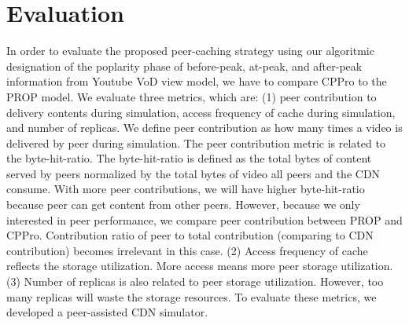 


\section{Evaluation}\label{evaluation}
In order to evaluate the proposed peer-caching strategy using our algoritmic designation of the poplarity phase of before-peak, at-peak, and after-peak information from Youtube VoD view model, we have to compare CPPro to the PROP model.
We evaluate three metrics, which are: (1) peer contribution to delivery contents during simulation,  access frequency of cache during simulation, and number of replicas. 
We define peer contribution as how many times a video is delivered by peer during simulation.
The peer contribution metric is related to the byte-hit-ratio. 
The byte-hit-ratio is defined as the total bytes of content served by peers normalized by the total bytes of video all peers and the CDN consume.
With more peer contributions, we will have higher byte-hit-ratio because peer can get content from other peers. 
However, because we only interested in peer performance, we compare peer contribution between PROP and CPPro.
Contribution ratio of peer to total contribution (comparing to CDN contribution) becomes irrelevant in this case.
(2) Access frequency of cache reflects the storage utilization. 
More access means more peer storage utilization.  
(3) Number of replicas is also related to peer storage utilization.  
However, too many replicas will waste the storage resources.
To evaluate these metrics, we developed a peer-assisted CDN simulator. 


